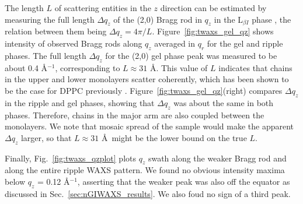 The length $L$ of scattering entities in the $z$ direction can be estimated by 
measuring the full length $\Delta q_z$ of the (2,0) Bragg rod in $q_z$ in
the L$_{\beta I}$ phase \cite{ref:Tristram93},
the relation between them being $\Delta q_z = 4\pi/L$.
Figure~\ref{fig:twaxs_gel_qz} shows intensity of observed Bragg rods along $q_z$ averaged in $q_r$
for the gel and ripple phases. The full length $\Delta q_z$ for the (2,0) gel
phase peak was measured to be about 0.4 \AA$^{-1}$, corresponding to 
$L \approx 31$ \AA. This value of $L$ indicates that chains in the upper and
lower monolayers scatter coherently, which has been shown to be the case
for DPPC previously \cite{ref:Tristram93}.
Figure~\ref{fig:twaxs_gel_qz}(right) compares $\Delta q_z$ in the ripple and gel phases,
showing that $\Delta q_z$ was about the same in both phases. Therefore, 
chains in the major arm are also coupled between the monolayers. 
We note that mosaic spread of the sample would make the apparent $\Delta q_z$ 
larger, so that $L \approx 31$ \AA\ might be the lower bound on the true $L$. 

Finally, Fig.~\ref{fig:twaxs_qzplot} plots $q_z$ swath along the weaker 
Bragg rod and along the entire ripple WAXS pattern. 
We found no obvious intensity maxima
below $q_z$ = 0.12 \AA$^{-1}$, asserting that the weaker peak was also
off the equator as discussed in Sec.~\ref{sec:nGIWAXS_results}.
We also foud no sign of a third peak.

